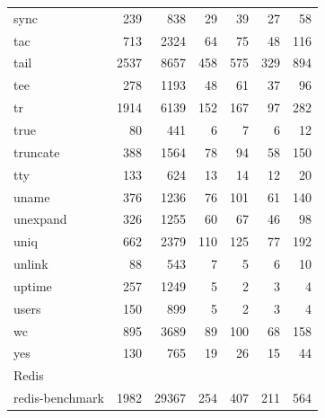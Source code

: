 \begin{longtable}{lrrrrrr}
    sync            & 239        & 838      & 29              & 39              & 27             & 58       \\
    tac             & 713        & 2324     & 64              & 75              & 48             & 116      \\
    tail            & 2537       & 8657     & 458             & 575             & 329            & 894      \\
    tee             & 278        & 1193     & 48              & 61              & 37             & 96       \\
    tr              & 1914       & 6139     & 152             & 167             & 97             & 282      \\
    true            & 80         & 441      & 6               & 7               & 6              & 12       \\
    truncate        & 388        & 1564     & 78              & 94              & 58             & 150      \\
    tty             & 133        & 624      & 13              & 14              & 12             & 20       \\
    uname           & 376        & 1236     & 76              & 101             & 61             & 140      \\
    unexpand        & 326        & 1255     & 60              & 67              & 46             & 98       \\
    uniq            & 662        & 2379     & 110             & 125             & 77             & 192      \\
    unlink          & 88         & 543      & 7               & 5               & 6              & 10       \\
    uptime          & 257        & 1249     & 5               & 2               & 3              & 4        \\
    users           & 150        & 899      & 5               & 2               & 3              & 4        \\
    wc              & 895        & 3689     & 89              & 100             & 68             & 158      \\
    yes             & 130        & 765      & 19              & 26              & 15             & 44       \\
    \midrule 
    \multicolumn{7}{l}{Redis} \\
    \midrule 
    redis-benchmark & 1982       & 29367    & 254             & 407             & 211            & 564       \\

\end{longtable}
